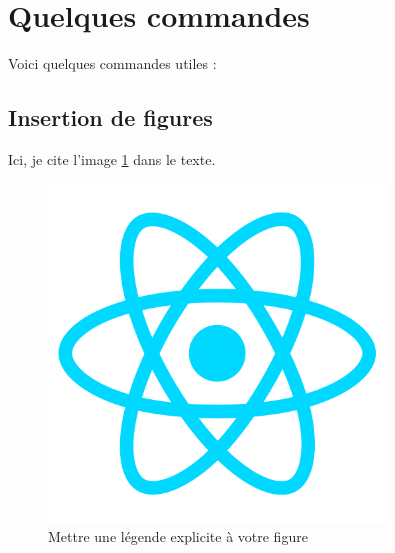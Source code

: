 \documentclass{rapportCS}
\begin{document}

\tabledematieres %







\newpage






\section{Quelques commandes}

Voici quelques commandes utiles :



\subsection{Insertion de figures}
Ici, je cite l'image \ref{fig:my_label} dans le texte.
\begin{figure}[h!]
    \centering
    \includegraphics[width=0.8\textwidth]{logos/react.png}
    \caption{Mettre une légende explicite à votre figure}
    \label{fig:my_label}
\end{figure}
\end{document}
